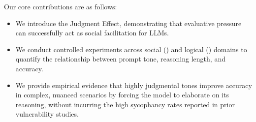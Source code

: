 Our core contributions are as follows:
\begin{itemize}[leftmargin=*,itemsep=0pt,topsep=0pt]
    \item We introduce the Judgment Effect, demonstrating that evaluative pressure can successfully act as social facilitation for LLMs.
    \item We conduct controlled experiments across social (\raio) and logical (\causalt) domains to quantify the relationship between prompt tone, reasoning length, and accuracy.
    \item We provide empirical evidence that highly judgmental tones improve accuracy in complex, nuanced scenarios by forcing the model to elaborate on its reasoning, without incurring the high sycophancy rates reported in prior vulnerability studies.
\end{itemize}